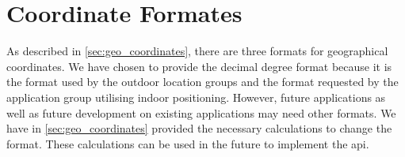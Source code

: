 \section{Coordinate Formates}
As described in \cref{sec:geo_coordinates}, there are three formats for geographical coordinates. We have chosen to provide the decimal degree format because it is the format used by the outdoor location groups and the format requested by the application group utilising indoor positioning.
However, future applications as well as future development on existing applications may need other formats. We have in \cref{sec:geo_coordinates} provided the necessary calculations to change the format. These calculations can be used in the future to implement the api.